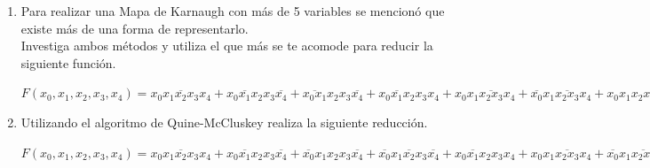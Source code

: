 \documentclass[a4paper,12pt]{article}
\begin{document}
\begin{enumerate}[label=\textcolor{teal}{\textbf{\arabic*.}}]
    \item Para realizar una Mapa de Karnaugh con más de 5 variables se mencionó que existe más de
    una forma de representarlo.\\
    Investiga ambos métodos y utiliza el que más se te acomode para reducir la siguiente función.

    \begin{center}
        $F(x_0,x_1,x_2,x_3,x_4) = 
        \overline{x_0 x_1 x_2 x_3 x_4} 
        + \overline{x_0 x_1 x_2} x_3 \overline{x_4} 
        + \overline{x_0 x_1} x_2 x_3 \overline{x_4} 
        + x_0 \overline{x_1} x_2 x_3 x_4
        + x_0 x_1 \overline{x_2 x_3} x_4
        + \overline{x_0} x_1 \overline{x_2 x_3} x_4
        + x_0 x_1 x_2 x_3 x_4 
        $
    \end{center}
   
    \item Utilizando el algoritmo de Quine-McCluskey realiza la siguiente reducción.\\

        \begin{center}
            $F(x_0,x_1,x_2,x_3,x_4) = 
            \overline{x_0 x_1 x_2 x_3 x_4} 
            + \overline{x_0 x_1 x_2} x_3 \overline{x_4} 
            + \overline{x_0} x_1 x_2 x_3 \overline{x_4}   
            + \overline{x_0} x_1 \overline{x_2} x_3 \overline{x_4}  
            + x_0 \overline{x_1} x_2 x_3 x_4    
            + x_0 x_1 \overline{ x_2 x_3} x_4 
            + \overline{x_0} x_1 \overline{ x_2 x_3} x_4 
            + x_0 x_1 x_2 \overline{ x_3} x_4
            + x_0 x_1 x_2 x_3 x_4
            $
        \end{center}
        

\end{enumerate}
\end{document}
